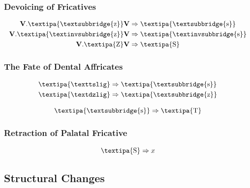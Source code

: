 \documentclass{report}[12pt]
\begin{document}
\subsubsection{Devoicing of Fricatives}

\begin{tcolorbox}
  \begin{align*}
    \textbf{V}.\text{\textipa{\textsubbridge{z}}}\textbf{V} & \Rightarrow \text{\textipa{\textsubbridge{s}}} \\
    \textbf{V}.\text{\textipa{\textinvsubbridge{z}}}\textbf{V} & \Rightarrow \text{\textipa{\textinvsubbridge{s}}} \\
    \textbf{V}.\text{\textipa{Z}}\textbf{V} & \Rightarrow \text{\textipa{S}} \\
  \end{align*}
\end{tcolorbox}

\subsubsection{The Fate of Dental Affricates}

\begin{tcolorbox}
  \begin{align*}
    \text{\textipa{\texttslig}} & \Rightarrow \text{\textipa{\textsubbridge{s}}} \\
    \text{\textipa{\textdzlig}} & \Rightarrow \text{\textipa{\textsubbridge{z}}} \\
  \end{align*}
\end{tcolorbox}

\begin{tcolorbox}
  \[ \text{\textipa{\textsubbridge{s}}} \Rightarrow \text{\textipa{T}} \]
\end{tcolorbox}

\subsubsection{Retraction of Palatal Fricative}

\begin{tcolorbox}
  \[ \text{\textipa{S}} \Rightarrow x \]  
\end{tcolorbox}

\subsection{Structural Changes}
\end{document}
